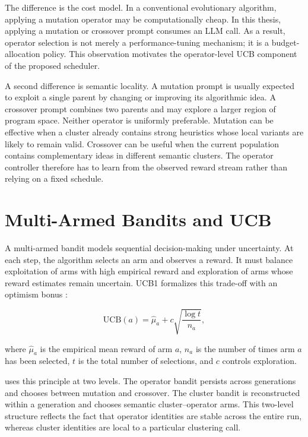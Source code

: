 \documentclass[../main.tex]{subfiles}
\begin{document}
The difference is the cost model. In a conventional evolutionary algorithm, applying a mutation operator may be computationally cheap. In this thesis, applying a mutation or crossover prompt consumes an LLM call. As a result, operator selection is not merely a performance-tuning mechanism; it is a budget-allocation policy. This observation motivates the operator-level UCB component of the proposed scheduler.

A second difference is semantic locality. A mutation prompt is usually expected to exploit a single parent by changing or improving its algorithmic idea. A crossover prompt combines two parents and may explore a larger region of program space. Neither operator is uniformly preferable. Mutation can be effective when a cluster already contains strong heuristics whose local variants are likely to remain valid. Crossover can be useful when the current population contains complementary ideas in different semantic clusters. The operator controller therefore has to learn from the observed reward stream rather than relying on a fixed schedule.

\section{Multi-Armed Bandits and UCB}

A multi-armed bandit models sequential decision-making under uncertainty. At each step, the algorithm selects an arm and observes a reward. It must balance exploitation of arms with high empirical reward and exploration of arms whose reward estimates remain uncertain. UCB1 formalizes this trade-off with an optimism bonus \cite{auer2002ucb,bubeck2012bandits}:

\begin{equation}
  \mathrm{UCB}(a)
  =
  \hat{\mu}_a
  +
  c\sqrt{\frac{\log t}{n_a}},
\end{equation}

where $\hat{\mu}_a$ is the empirical mean reward of arm $a$, $n_a$ is the number of times arm $a$ has been selected, $t$ is the total number of selections, and $c$ controls exploration.

\bmab{} uses this principle at two levels. The operator bandit persists across generations and chooses between mutation and crossover. The cluster bandit is reconstructed within a generation and chooses semantic cluster--operator arms. This two-level structure reflects the fact that operator identities are stable across the entire run, whereas cluster identities are local to a particular clustering call.
\end{document}

